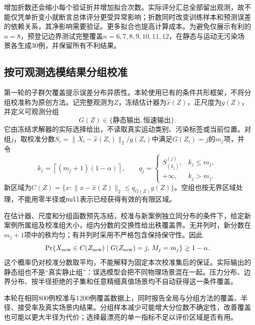 增加折数还会缩小每个验证折并增加拟合次数。实际评分汇总全部留出观测，故不能仅凭单折变小就断言总体评分更受异常影响；折数同时改变训练样本和预测误差的依赖关系，其净影响需要验证。更多拟合也提高计算成本。为避免仅展示有利的$n=8$，预登记边界测试完整覆盖$n=6,7,8,9,10,11,12$，在静态与运动无污染场景各生成30例，并保留所有不利结果。

\subsection{按可观测选模结果分组校准}
第一轮的子群欠覆盖提示误差分布异质性。本轮使用已有的条件共形框架\cite{vovk2012conditional}，不将分组校准称为原创方法。记完整观测为$Z$，冻结估计器为$\widehat x(Z)$，正尺度为$g(Z)$，并定义可观测分组
\[
 G(Z)\in\{\text{静态输出},\text{恒速输出}\}.
\]
它由冻结求解器的实际选择给出，不读取真实运动类别、污染标签或当前位置。对组$j$，取校准分数$S_i=\|X_i-\widehat x(Z_i)\|_2/g(Z_i)$中满足$G(Z_i)=j$的$m_j$项，并令
\[
 k_j=\left\lceil(m_j+1)(1-\alpha)\right\rceil,\qquad
 q_j=\begin{cases}S^{(j)}_{(k_j)},&k_j\le m_j,\\+\infty,&k_j>m_j.\end{cases}
\]
新区域为$C(Z)=\{x:\|x-\widehat x(Z)\|_2\le q_{G(Z)}g(Z)\}$。空组也按无界区域处理，不能用零半径或\texttt{null}表示已经获得有效的有限区域。

在估计器、尺度和分组函数预先冻结，校准与新案例独立同分布的条件下，给定新案例所属组及校准组大小，组内分数的交换性给出秩覆盖界。无并列时，新分数在$m_j+1$项中的秩均匀；有并列时采用不严格包含保持保守性。因此
\[
 \Pr\{X_{\rm new}\in C(Z_{\rm new})\mid G(Z_{\rm new})=j,\,M_j=m_j\}\ge1-\alpha.
\]
这个概率仍对校准分数取平均，不能解释为固定本次校准集后的保证。实际输出的静态组也不是“真实静止组”：误选模型会把不同物理场景混在一起。压力分布、边界分布、按半径拒绝的子集和任意精细真值场景均不自动获得这一条件覆盖。

本轮在相同800例校准与1200例覆盖数据上，同时报告全局与分组方法的覆盖、半径、接受率及真实场景内结果。分组样本减少可能增大分位数不确定性，改善覆盖也可能以更大半径为代价；选择最漂亮的单一指标不足以评价区域是否有用。
